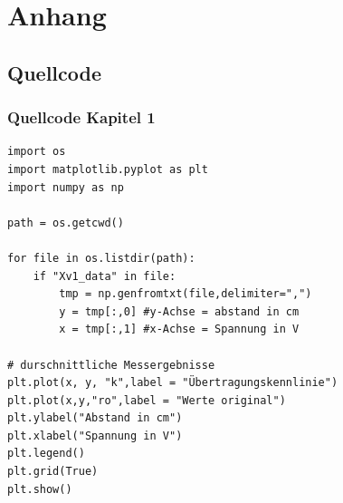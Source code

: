 \documentclass[12pt,oneside,a4paper]{report}
\begin{document}
%
%
\renewcommand\thesection{A.\arabic{section}}
\renewcommand\thesubsection{\thesection.\arabic{subsection}}

\chapter*{Anhang}
\label{chap:APPENDIX}
\addtocounter{chapter}{1}
\setcounter{section}{0}

\section{Quellcode}
\label{chap:APPENDIX_SOURCECODE}

\subsection{Quellcode Kapitel 1}
\label{chap:APPENDIX_SOURCECODE_V1}

\begin{lstlisting}[style=PYTHON,frame=single,
 caption=Durchschnittliche Messergebnisse 10 - 70 cm,
 captionpos=b,
 label=lst:lst1_10_70]
import os
import matplotlib.pyplot as plt
import numpy as np

path = os.getcwd()

for file in os.listdir(path):
    if "Xv1_data" in file:
        tmp = np.genfromtxt(file,delimiter=",") 
        y = tmp[:,0] #y-Achse = abstand in cm
        x = tmp[:,1] #x-Achse = Spannung in V

# durschnittliche Messergebnisse
plt.plot(x, y, "k",label = "Übertragungskennlinie")
plt.plot(x,y,"ro",label = "Werte original")
plt.ylabel("Abstand in cm")
plt.xlabel("Spannung in V")
plt.legend()
plt.grid(True)
plt.show()

\end{lstlisting}
\newpage
\end{document}

